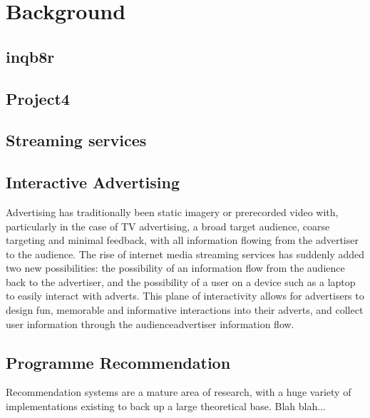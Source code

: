 \section{Background}

	\subsection{inqb8r}

	\subsection{Project4}

	\subsection{Streaming services}

	\subsection{Interactive Advertising}

	Advertising has traditionally been static imagery or prerecorded video with, particularly in the case of TV advertising, a broad target audience, coarse targeting and minimal feedback, with all information flowing from the advertiser to the audience. The rise of internet media streaming services has suddenly added two new possibilities: the possibility of an information flow from the audience back to the advertiser, and the possibility of a user on a device such as a laptop to easily interact with adverts. This plane of interactivity allows for advertisers to design fun, memorable and informative interactions into their adverts, and collect user information through the audience\rightarrow advertiser information flow.



	\subsection{Programme Recommendation}

	Recommendation systems are a mature area of research, with a huge variety of implementations existing to back up a large theoretical base. Blah blah...


